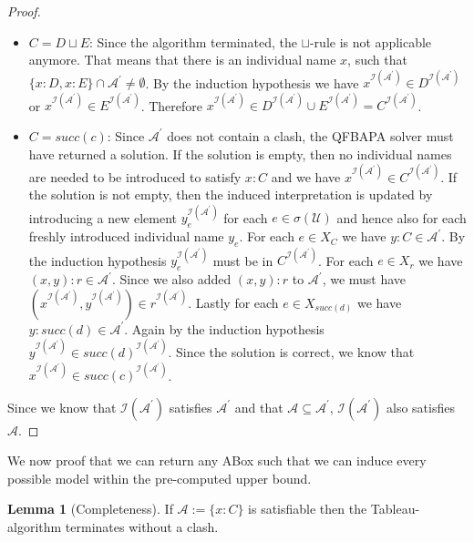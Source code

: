 \documentclass{book}
\theoremstyle{break}
\theoremstyle{definition}
\newtheorem{mylem}{Lemma}
\begin{document}
\begin{proof}
\begin{itemize}
\item $C=D\sqcup E$: Since the algorithm terminated, the $\sqcup$-rule is not applicable anymore. That means that there is an individual name $x$, such that $\{x:D, x:E\}\cap \mathcal{A}^\prime\neq \emptyset$. By the induction hypothesis we have $x^{\mathcal{I}(\mathcal{A}^\prime)}\in D^{\mathcal{I}(\mathcal{A}^\prime)}$ or $x^{\mathcal{I}(\mathcal{A}^\prime)}\in E^{\mathcal{I}(\mathcal{A}^\prime)}$. Therefore $x^{\mathcal{I}(\mathcal{A}^\prime)}\in D^{\mathcal{I}(\mathcal{A}^\prime)}\cup E^{\mathcal{I}(\mathcal{A}^\prime)}=C^{\mathcal{I}(\mathcal{A}^\prime)}$.
\item $C=succ(c)$: Since $\mathcal{A}^\prime$ does not contain a clash, the QFBAPA solver must have returned a solution. If the solution is empty, then no individual names are needed to be introduced to satisfy $x:C$ and we have $x^{\mathcal{I}(\mathcal{A}^\prime)}\in C^{\mathcal{I}(\mathcal{A}^\prime)}$. If the solution is not empty, then the induced interpretation is updated by introducing a new element $y_e^{\mathcal{I}(\mathcal{A}^\prime)}$ for each $e\in \sigma(\mathcal{U})$ and hence also for each freshly introduced individual name $y_e$. For each $e\in X_C$ we have $y:C\in \mathcal{A}^\prime$. By the induction hypothesis $y_e^{\mathcal{I}(\mathcal{A}^\prime)}$ must be in $C^{\mathcal{I}(\mathcal{A}^\prime)}$. For each $e\in X_r$ we have $(x,y):r\in\mathcal{A}^\prime$. Since we also added $(x,y):r$ to $\mathcal{A}^\prime$, we must have $(x^{\mathcal{I}(\mathcal{A}^\prime)},y^{\mathcal{I}(\mathcal{A}^\prime)})\in r^{\mathcal{I}(\mathcal{A}^\prime)}$. Lastly for each $e\in X_{succ(d)}$ we have $y:succ(d)\in\mathcal{A}^\prime$. Again by the induction hypothesis $y^{\mathcal{I}(\mathcal{A}^\prime)}\in succ(d)^{\mathcal{I}(\mathcal{A}^\prime)}$. Since the solution is correct, we know that $x^{\mathcal{I}(\mathcal{A}^\prime)}\in succ(c)^{\mathcal{I}(\mathcal{A}^\prime)}$.
\end{itemize}
Since we know that $\mathcal{I}(\mathcal{A}^\prime)$ satisfies $\mathcal{A}^\prime$ and that $\mathcal{A}\subseteq \mathcal{A}^\prime$, $\mathcal{I}(\mathcal{A}^\prime)$ also satisfies $\mathcal{A}$.
\end{proof}
We now proof that we can return any ABox such that we can induce every possible model within the pre-computed upper bound.
\begin{mylem}[Completeness]
If $\mathcal{A}:=\{x:C\}$ is satisfiable then the Tableau-algorithm terminates without a clash.
\end{mylem}
\end{document}
